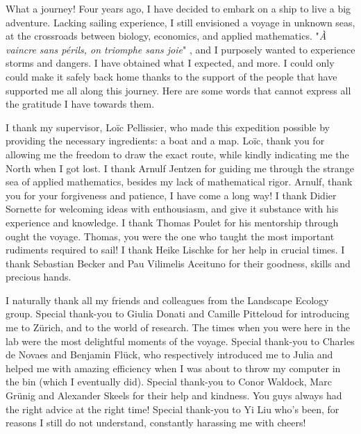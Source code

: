 %
\label{sec:acknowledgement}


What a journey!
% 
Four years ago, I have decided to embark on a ship to live a big adventure.
% 
Lacking sailing experience, I still envisioned a voyage in unknown seas, at the crossroads between biology, economics, and applied mathematics.
% 
"\textit{À vaincre sans périls, on triomphe sans joie}" \citep{maufrais1997aventures}, and I purposely wanted to experience storms and dangers.
% 
I have obtained what I expected, and more.
% 
I could only could make it safely back home thanks to the support of the people that have supported me all along this journey. Here are some words that cannot express all the gratitude I have towards them.

I thank my supervisor, Loïc Pellissier, who made this expedition possible by providing the necessary ingredients: a boat and a map. Loïc, thank you for allowing me the freedom to draw the exact route, while kindly indicating me the North when I got lost.
% 
I thank Arnulf Jentzen for guiding me through the strange sea of applied mathematics, besides my lack of mathematical rigor. Arnulf, thank you for your forgiveness and patience, I have come a long way!
% 
I thank Didier Sornette for welcoming ideas with enthousiasm, and give it substance with his experience and knowledge.
% 
I thank Thomas Poulet for his mentorship through ought the voyage. Thomas, you were the one who taught the most important rudiments required to sail! 
% 
I thank Heike Lischke for her help in crucial times.
% 
I thank Sebastian Becker and Pau Vilimelis Aceituno for their goodness, skills and precious hands.
% 

% 
I naturally thank all my friends and colleagues from the Landscape Ecology group. Special thank-you to Giulia Donati and Camille Pitteloud for introducing me to Zürich, and to the world of research. The times when you were here in the lab were the most delightful moments of the voyage.
% 
Special thank-you to Charles de Novaes and Benjamin Flück, who respectively introduced me to Julia and helped me with amazing efficiency when I was about to throw my computer in the bin (which I eventually did).
% 
Special thank-you to Conor Waldock, Marc Grünig and Alexander Skeels for their help and kindness. You guys always had the right advice at the right time!
% 
Special thank-you to Yi Liu who's been, for reasons I still do not understand, constantly harassing me with cheers! 

